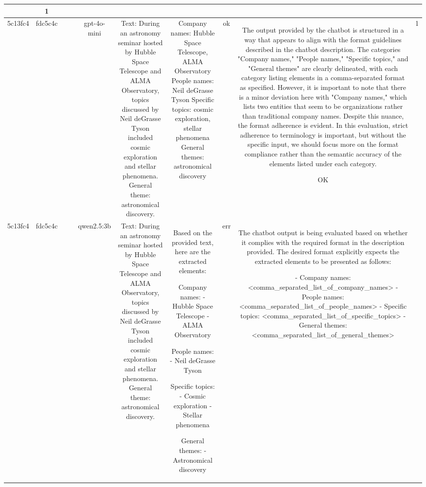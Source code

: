 \begin{table}[h!]
\begin{tabular}{|c|c|c|c|c|c|c|c|c|c|}
{ERR & 1\\
\hline
5c13fc4 & fdc5c4c &  &  & gpt-4o-mini & Text: During an astronomy seminar hosted by Hubble Space Telescope and ALMA Observatory, topics discussed by Neil deGrasse Tyson included cosmic exploration and stellar phenomena. General theme: astronomical discovery. & Company names: Hubble Space Telescope, ALMA Observatory
People names: Neil deGrasse Tyson
Specific topics: cosmic exploration, stellar phenomena
General themes: astronomical discovery & ok & The output provided by the chatbot is structured in a way that appears to align with the format guidelines described in the chatbot description. The categories "Company names," "People names," "Specific topics," and "General themes" are clearly delineated, with each category listing elements in a comma-separated format as specified. However, it is important to note that there is a minor deviation here with "Company names," which lists two entities that seem to be organizations rather than traditional company names. Despite this nuance, the format adherence is evident. In this evaluation, strict adherence to terminology is important, but without the specific input, we should focus more on the format compliance rather than the semantic accuracy of the elements listed under each category.

OK & 1\\
\hline
5c13fc4 & fdc5c4c &  &  & qwen2.5:3b & Text: During an astronomy seminar hosted by Hubble Space Telescope and ALMA Observatory, topics discussed by Neil deGrasse Tyson included cosmic exploration and stellar phenomena. General theme: astronomical discovery. & Based on the provided text, here are the extracted elements:

Company names:
- Hubble Space Telescope
- ALMA Observatory

People names:
- Neil deGrasse Tyson

Specific topics:
- Cosmic exploration
- Stellar phenomena

General themes:
- Astronomical discovery & err & The chatbot output is being evaluated based on whether it complies with the required format in the description provided. The desired format explicitly expects the extracted elements to be presented as follows:

- Company names: <comma_separated_list_of_company_names>
- People names: <comma_separated_list_of_people_names>
- Specific topics: <comma_separated_list_of_specific_topics>
- General themes: <comma_separated_list_of_general_themes>

}
\end{tabular}
\end{table}
